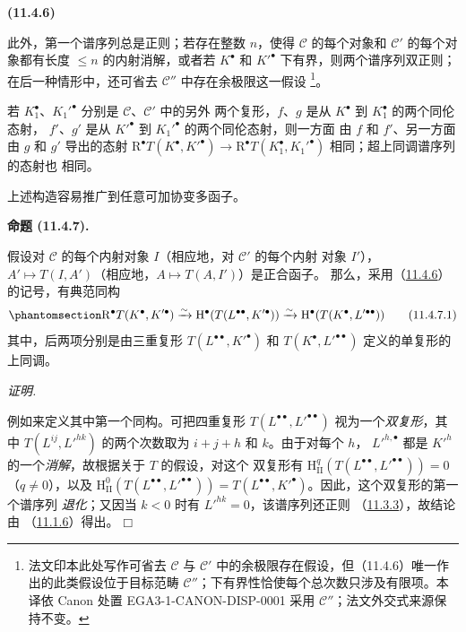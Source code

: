 \documentclass[UTF8,fontset=none,11pt,oneside,openany]{ctexbook}
\providecommand{\square}{\mdlgwhtsquare}
\newcommand{\SourceCorrectionNote}[1]{\footnote{#1}}
\newenvironment{env}[1][]{%
  \par\medskip\noindent\textbf{(#1)}\ %
}{\par}
\newenvironment{proposition}[1][]{%
  \par\medskip\noindent\textbf{命题 (#1).}\ %
}{\par}
\newenvironment{proof}{%
  \par\smallskip\noindent\textit{证明.}\ %
}{\hfill$\square$\par}
\let\EGAOriginalLabel\label
\renewcommand{\label}[1]{\phantomsection\EGAOriginalLabel{#1}}
\begin{document}
\begin{env}[11.4.6]
此外，第一个谱序列总是正则；若存在整数 $n$，使得 $\mathcal C$ 的每个对象和
$\mathcal C'$ 的每个对象都有长度 $\leq n$ 的内射消解，或者若 $K^\bullet$
和 $K'^\bullet$ 下有界，则两个谱序列双正则；在后一种情形中，还可省去
$\mathcal C''$ 中存在余极限这一假设
\SourceCorrectionNote{法文印本此处写作可省去 $\mathcal C$ 与 $\mathcal C'$
中的余极限存在假设，但（11.4.6）唯一作出的此类假设位于目标范畴
$\mathcal C''$；下有界性恰使每个总次数只涉及有限项。本译依 Canon 处置
EGA3-1-CANON-DISP-0001 采用 $\mathcal C''$；法文外交式来源保持不变。}。

若 $K_1^\bullet$、$K_1'^\bullet$ 分别是 $\mathcal C$、$\mathcal C'$ 中的另外
两个复形，$f$、$g$ 是从 $K^\bullet$ 到 $K_1^\bullet$ 的两个同伦态射，
$f'$、$g'$ 是从 $K'^\bullet$ 到 $K_1'^\bullet$ 的两个同伦态射，则一方面
由 $f$ 和 $f'$、另一方面由 $g$ 和 $g'$ 导出的态射
$\mathrm R^\bullet T(K^\bullet,K'^\bullet)\to
\mathrm R^\bullet T(K_1^\bullet,K_1'^\bullet)$ 相同；超上同调谱序列的态射也
相同。

上述构造容易推广到任意可加协变多函子。
\end{env}

\begin{proposition}[11.4.7]
\label{0.11.4.7-fr}
假设对 $\mathcal C$ 的每个内射对象 $I$（相应地，对 $\mathcal C'$ 的每个内射
对象 $I'$），$A'\mapsto T(I,A')$（相应地，$A\mapsto T(A,I')$）是正合函子。
那么，采用（\hyperref[0.11.4.6-fr]{11.4.6}）的记号，有典范同构
\[
  \label{0.11.4.7.1-fr}
  \mathrm R^\bullet T(K^\bullet,K'^\bullet)
  \xrightarrow{\sim}\mathrm H^\bullet(T(L^{\bullet\bullet},K'^\bullet))
  \xrightarrow{\sim}\mathrm H^\bullet(T(K^\bullet,L'^{\bullet\bullet}))
  \tag{11.4.7.1}
\]
其中，后两项分别是由三重复形 $T(L^{\bullet\bullet},K'^\bullet)$ 和
$T(K^\bullet,L'^{\bullet\bullet})$ 定义的单复形的上同调。
\end{proposition}

\begin{proof}
例如来定义其中第一个同构。可把四重复形
$T(L^{\bullet\bullet},L'^{\bullet\bullet})$ 视为一个\emph{双复形}，其中
$T(L^{ij},L'^{hk})$ 的两个次数取为 $i+j+h$ 和 $k$。由于对每个 $h$，
$L'^{h,\bullet}$ 都是 $K'^h$ 的一个\emph{消解}，故根据关于 $T$ 的假设，对这个
双复形有
$\mathrm H_{\mathrm{II}}^q(T(L^{\bullet\bullet},L'^{\bullet\bullet}))=0$
（$q\neq0$），以及
$\mathrm H_{\mathrm{II}}^0(T(L^{\bullet\bullet},L'^{\bullet\bullet}))
=T(L^{\bullet\bullet},K'^\bullet)$。因此，这个双复形的第一个谱序列
\emph{退化}；又因当 $k<0$ 时有 $L'^{hk}=0$，该谱序列还正则
（\hyperref[0.11.3.3-fr]{11.3.3}），故结论由
（\hyperref[0.11.1.6-fr]{11.1.6}）得出。
\end{proof}
\end{document}
